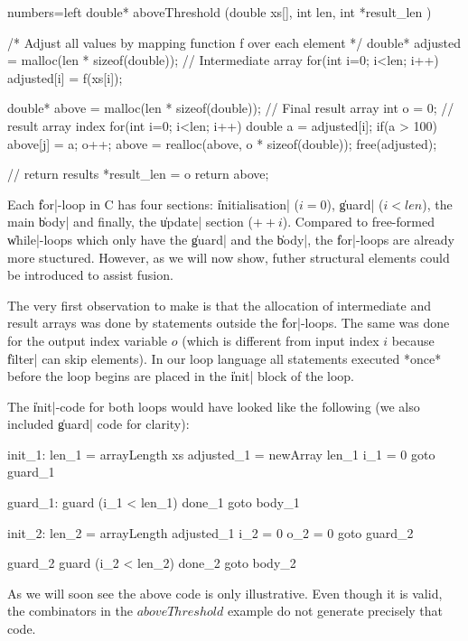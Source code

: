 \documentclass[preamble.tex]{subfiles}
\begin{document}
\begin{ccode}{numbers=left}
double* aboveThreshold (double xs[], int len, int *result_len ) {

  /* Adjust all values by mapping function f over each element */
  double* adjusted = malloc(len * sizeof(double)); // Intermediate array
  for(int i=0; i<len; i++) {
      adjusted[i] = f(xs[i]);
  }

  double* above = malloc(len * sizeof(double));     // Final result array
  int o = 0; // result array index
  for(int i=0; i<len; i++) {
      double a = adjusted[i];
      if(a > 100) {
          above[j] = a;
          o++;
      }
  }
  above = realloc(above, o * sizeof(double));
  free(adjusted);

  // return results
  *result_len = o
  return above;
}
\end{ccode}


Each \|for|-loop in C has four sections: \|initialisation| ($i=0$), \|guard| ($i<len$), the main \|body| and finally, the \|update| section ($++i$). Compared to free-formed \|while|-loops which only have the \|guard| and the \|body|, the \|for|-loops are already more stuctured. However, as we will now show, futher structural elements could be introduced to assist fusion.

The very first observation to make is that the allocation of intermediate and result arrays was done by statements outside the \|for|-loops. The same was done for the output index variable $o$ (which is different from input index $i$ because \|filter| can skip elements). In our loop language all statements executed *once* before the loop begins are placed in the \|init| block of the loop.

The \|init|-code for both loops would have looked like the following (we also included \|guard| code for clarity):
\begin{loopcode}
  init_1:
    len_1 = arrayLength xs
    adjusted_1 = newArray len_1
    i_1 = 0
    goto guard_1

  guard_1:
    guard (i_1 < len_1) done_1
    goto body_1

  init_2:
    len_2 = arrayLength adjusted_1
    i_2 = 0
    o_2 = 0
    goto guard_2

  guard_2
    guard (i_2 < len_2) done_2
    goto body_2

\end{loopcode}

As we will soon see the above code is only illustrative. Even though it is valid, the combinators in the $aboveThreshold$ example do not generate precisely that code.
\end{document}
